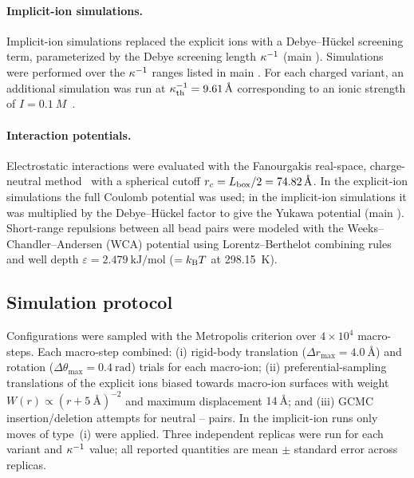\documentclass{article}
\begin{document}
\paragraph{Implicit-ion simulations.}

Implicit-ion simulations replaced the explicit ions with a Debye--Hückel screening term, parameterized by the Debye screening length $\kappa^{-1}$ (main ).
Simulations were performed over the $\kappa^{-1}$ ranges listed in main .
For each charged variant, an additional simulation was run at $\kappa^{-1}_\mathrm{th} = \qty{9.61}{\angstrom}$ corresponding to an ionic strength of $I = \qty{0.1}{M}$~\cite{israelachvili2011}.

\paragraph{Interaction potentials.}

Electrostatic interactions were evaluated with the Fanourgakis real-space, charge-neutral method~\cite{fanourgakis2009} with a spherical cutoff $r_c = L_\mathrm{box}/2 = \qty{74.82}{\angstrom}$.
In the explicit-ion simulations the full Coulomb potential was used; in the implicit-ion simulations it was multiplied by the Debye--Hückel factor to give the Yukawa potential (main ).
Short-range repulsions between all bead pairs were modeled with the Weeks--Chandler--Andersen (WCA) potential using Lorentz--Berthelot combining rules and well depth $\varepsilon = \qty{2.479}{\kilo\joule\per\mol}$ ($= k_{\rm B}T$ at \qty{298.15}{\kelvin}).

\subsection{Simulation protocol}

Configurations were sampled with the Metropolis criterion over $4\times10^4$ macro-steps.
Each macro-step combined:
(i) rigid-body translation ($\Delta r_{\max} = \qty{4.0}{\angstrom}$) and rotation ($\Delta\theta_{\max} = \qty{0.4}{\radian}$) trials for each macro-ion;
(ii) preferential-sampling translations of the explicit ions biased towards macro-ion surfaces with weight $W(r) \propto (r + \qty{5}{\angstrom})^{-2}$ and maximum displacement $\qty{14}{\angstrom}$; and
(iii) GCMC insertion/deletion attempts for neutral -- pairs.
In the implicit-ion runs only moves of type~(i) were applied.
Three independent replicas were run for each variant and $\kappa^{-1}$ value; all reported quantities are mean $\pm$ standard error across replicas.
\end{document}

